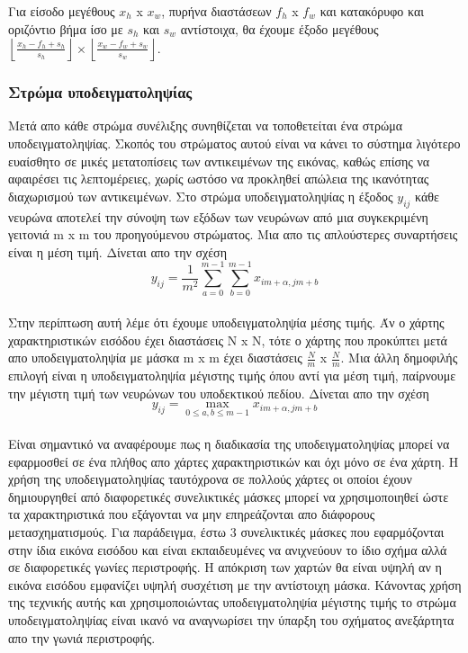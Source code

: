\documentclass[12pt]{article}
\numberwithin{equation}{section}
\begin{document}
Για είσοδο μεγέθους \(x_h\) x \(x_w\), πυρήνα διαστάσεων \(f_h\) x \(f_w\) και κατακόρυφο και οριζόντιο βήμα ίσο με \(s_h\) και \(s_w\) αντίστοιχα, θα έχουμε έξοδο μεγέθους \(
\left\lfloor \frac{x_h - f_h + s_h}{s_h} \right\rfloor 
\times 
\left\lfloor \frac{x_w - f_w + s_w}{s_w} \right\rfloor
\).




\subsubsection{Στρώμα υποδειγματοληψίας}

Μετά απο κάθε στρώμα συνέλιξης συνηθίζεται να τοποθετείται ένα στρώμα υποδειγματοληψίας. Σκοπός του στρώματος αυτού είναι να κάνει το σύστημα λιγότερο ευαίσθητο σε μικές μετατοπίσεις των αντικειμένων της εικόνας, καθώς επίσης να αφαιρέσει τις λεπτομέρειες, χωρίς ωστόσο να προκληθεί απώλεια της ικανότητας διαχωρισμού των αντικειμένων. Στο στρώμα υποδειγματοληψίας η έξοδος \(y_{ij}\) κάθε νευρώνα αποτελεί την σύνοψη των εξόδων των νευρώνων από μια συγκεκριμένη γειτονιά m x m του προηγούμενου στρώματος. Μια απο τις απλούστερες συναρτήσεις είναι η μέση τιμή. Δίνεται απο την σχέση\\

\begin{equation}
y_{ij} = \frac{1}{m^2} \sum_{a=0}^{m-1} \sum_{b=0}^{m-1} x_{im+\alpha, jm+b}
\end{equation}\\

Στην περίπτωση αυτή λέμε ότι έχουμε υποδειγματοληψία μέσης τιμής. Άν ο χάρτης χαρακτηριστικών εισόδου έχει διαστάσεις N x N, τότε ο χάρτης που προκύπτει μετά απο υποδειγματοληψία με μάσκα m x m έχει διαστάσεις \(\frac{N}{m}\) x \(\frac{N}{m}\). Μια άλλη δημοφιλής επιλογή είναι η υποδειγματοληψία μέγιστης τιμής όπου αντί για μέση τιμή, παίρνουμε την μέγιστη τιμή των νευρώνων του υποδεκτικού πεδίου. Δίνεται απο την σχέση\\

\begin{equation}
y_{ij} = \max_{0 \leq a,b \leq m-1} x_{im+\alpha, jm+b}
\end{equation}\\

Είναι σημαντικό να αναφέρουμε πως η διαδικασία της υποδειγματοληψίας μπορεί να εφαρμοσθεί σε ένα πλήθος απο χάρτες χαρακτηριστικών και όχι μόνο σε ένα χάρτη. Η χρήση της υποδειγματοληψίας ταυτόχρονα σε πολλούς χάρτες οι οποίοι έχουν δημιουργηθεί από διαφορετικές συνελικτικές μάσκες μπορεί να χρησιμοποιηθεί ώστε τα χαρακτηριστικά που εξάγονται να μην επηρεάζονται απο διάφορους μετασχηματισμούς. Για παράδειγμα, έστω 3 συνελικτικές μάσκες που εφαρμόζονται στην ίδια εικόνα εισόδου και είναι εκπαιδευμένες να ανιχνεύουν το ίδιο σχήμα αλλά σε διαφορετικές γωνίες περιστροφής. Η απόκριση των χαρτών θα είναι υψηλή αν η εικόνα εισόδου εμφανίζει υψηλή συσχέτιση με την αντίστοιχη μάσκα. Κάνοντας χρήση της τεχνικής αυτής και χρησιμοποιώντας υποδειγματοληψία μέγιστης τιμής το στρώμα υποδειγματοληψίας είναι ικανό να αναγνωρίσει την ύπαρξη του σχήματος ανεξάρτητα απο την γωνιά περιστροφής. \\
\end{document}
